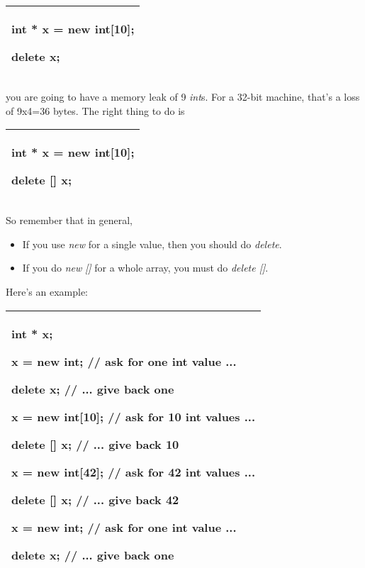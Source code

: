 \documentclass[
]{article}
\providecommand{\tightlist}{%
  \setlength{\itemsep}{0pt}\setlength{\parskip}{0pt}}
\begin{document}
\begin{longtable}[]{@{}l@{}}
\toprule
\endhead
\begin{minipage}[t]{0.97\columnwidth}\raggedright
int * x = new int{[}10{]};

delete x;\strut
\end{minipage}\tabularnewline
\bottomrule
\end{longtable}

you are going to have a memory leak of 9 \emph{int}s. For a 32-bit
machine, that's a loss of 9x4=36 bytes. The right thing to do is

\begin{longtable}[]{@{}l@{}}
\toprule
\endhead
\begin{minipage}[t]{0.97\columnwidth}\raggedright
int * x = new int{[}10{]};

delete {[}{]} x;\strut
\end{minipage}\tabularnewline
\bottomrule
\end{longtable}

So remember that in general,

\begin{itemize}
\tightlist
\item
  If you use \emph{new} for a single value, then you should do
  \emph{delete}.
\item
  If you do \emph{new} \emph{{[}{]}} for a whole array, you must do
  \emph{delete {[}{]}}.
\end{itemize}

Here's an example:

\begin{longtable}[]{@{}l@{}}
\toprule
\endhead
\begin{minipage}[t]{0.97\columnwidth}\raggedright
int * x;

x = new int; // ask for one int value ...

delete x; // ... give back one

x = new int{[}10{]}; // ask for 10 int values ...

delete {[}{]} x; // ... give back 10

x = new int{[}42{]}; // ask for 42 int values ...

delete {[}{]} x; // ... give back 42

x = new int; // ask for one int value ...

delete x; // ... give back one\strut
\end{minipage}\tabularnewline
\bottomrule
\end{longtable}
\end{document}
